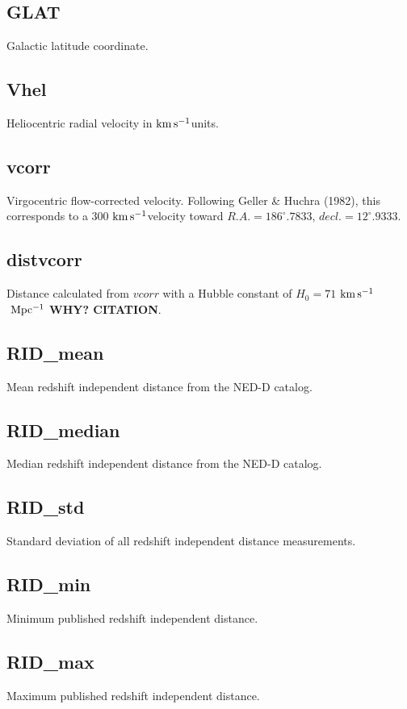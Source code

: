 \documentclass[iop]{emulateapj-rtx4}
\newcommand{\kms}{$\rm km\, s^{-1}$}
\begin{document}
\subsection{GLAT}
Galactic latitude coordinate.

\subsection{Vhel}
Heliocentric radial velocity in \kms units.

\subsection{vcorr}
Virgocentric flow-corrected velocity. Following Geller \& Huchra (1982), this corresponds to a 300 \kms velocity toward $R.A. = 186^{\circ}.7833$, $decl. = 12^{\circ}.9333$.

\subsection{distvcorr}
Distance calculated from $vcorr$ with a Hubble constant of $H_0 = 71$ \kms $~\rm Mpc^{-1}$ \textbf{WHY? CITATION}.

\subsection{RID\_mean}
Mean redshift independent distance from the NED-D catalog.

\subsection{RID\_median}
Median redshift independent distance from the NED-D catalog.

\subsection{RID\_std}
Standard deviation of all redshift independent distance measurements.

\subsection{RID\_min}
Minimum published redshift independent distance.

\subsection{RID\_max}
Maximum published redshift independent distance.
\end{document}

